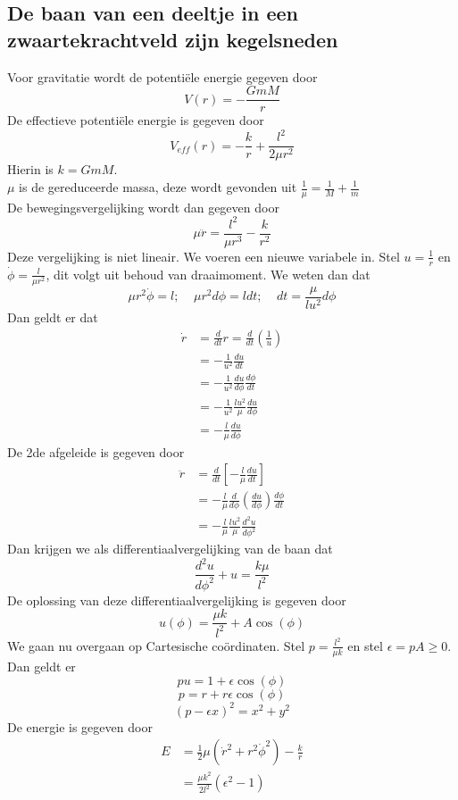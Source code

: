 \subsection{De baan van een deeltje in een zwaartekrachtveld zijn kegelsneden}
Voor gravitatie wordt de potentiële energie gegeven door
$$V(r)=-\frac{GmM}{r}$$
De effectieve potentiële energie is gegeven door
$$V_{eff}(r)=-\frac{k}{r}+\frac{l^{2}}{2\mu r^{2}}$$
Hierin is $k=GmM$.\\
$\mu$ is de gereduceerde massa, deze wordt gevonden uit $\frac{1}{\mu}=\frac{1}{M}+\frac{1}{m}$\\
De bewegingsvergelijking wordt dan gegeven door
$$\mu\ddot{r}=\frac{l^{2}}{\mu r^{3}}-\frac{k}{r^{2}}$$
Deze vergelijking is niet lineair. We voeren een nieuwe variabele in. Stel $u=\frac{1}{r}$ en $\dot{\phi}=\frac{l}{\mu r^{2}}$, dit volgt uit behoud van draaimoment. We weten dan dat
$$\mu r^{2}\dot{\phi}=l;\ \ \ \ \ \mu r^{2}d\phi=ldt;\ \ \ \ \ dt=\frac{\mu}{lu^{2}}d\phi$$
Dan geldt er dat
\begin{align}
\dot{r}&=\frac{d}{dt}r=\frac{d}{dt}\left(\frac{1}{u}\right) \nonumber \\
&=-\frac{1}{u^{2}}\frac{du}{dt} \nonumber \\
&=-\frac{1}{u^{2}}\frac{du}{d\phi}\frac{d\phi}{dt} \nonumber \\
&=-\frac{1}{u^{2}}\frac{lu^{2}}{\mu}\frac{du}{d\phi} \nonumber \\
&=-\frac{l}{\mu}\frac{du}{d\phi} \nonumber 
\end{align}
De 2de afgeleide is gegeven door
\begin{align}
\ddot{r}&=\frac{d}{dt}\left[-\frac{l}{\mu}\frac{du}{dt}\right] \nonumber \\
&=-\frac{l}{\mu}\frac{d}{d\phi}\left(\frac{du}{d\phi}\right)\frac{d\phi}{dt} \nonumber \\
&=-\frac{l}{\mu}\frac{lu^{2}}{\mu}\frac{d^{2}u}{d\phi^{2}} \nonumber 
\end{align}
Dan krijgen we als differentiaalvergelijking van de baan dat
$$\frac{d^{2}u}{d\phi^{2}}+u=\frac{k\mu}{l^{2}}$$
De oplossing van deze differentiaalvergelijking is gegeven door
$$u(\phi)=\frac{\mu k}{l^{2}}+A\cos(\phi)$$
We gaan nu overgaan op Cartesische coördinaten. Stel $p=\frac{l^{2}}{\mu k}$ en stel $\epsilon=pA\geq0$. Dan geldt er
$$pu=1+\epsilon\cos(\phi)$$
$$p=r+r\epsilon \cos(\phi)$$
$$(p-\epsilon x)^{2}=x^{2}+y^{2}$$
De energie is gegeven door
\begin{align}
    E&=\frac{1}{2}\mu(\dot{r}^{2}+r^{2}\dot{\phi}^{2})-\frac{k}{r}\nonumber \\
    &=\frac{\mu k^{2}}{2l^{2}}(\epsilon^{2}-1)
    \label{for: energie}
\end{align}
